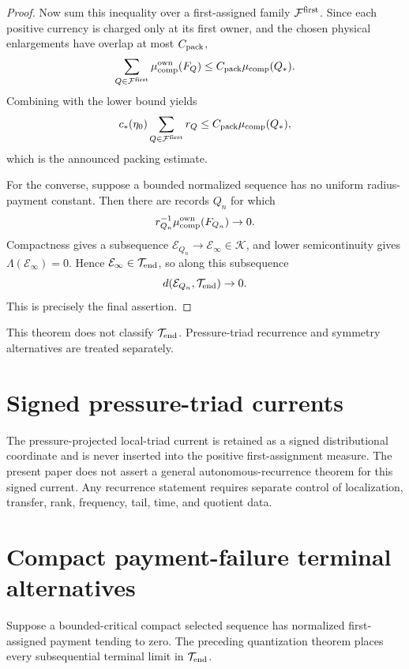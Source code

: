 \documentclass[11pt]{article}
\theoremstyle{definition}\newtheorem{problem}[theorem]{Problem}
\theoremstyle{definition}
\theoremstyle{remark}
\begin{document}
\begin{proof}
Now sum this inequality over a first-assigned family
\(\mathcal F^{\rm first}\).  Since each positive currency is charged only at
its first owner, and the chosen physical enlargements have overlap at most
\(C_{\rm pack}\),
\[
 \sum_{Q\in\mathcal F^{\rm first}}
 \mu_{\rm comp}^{\rm own}(F_Q)
 \le C_{\rm pack}\mu_{\rm comp}(Q_*).
\]
Combining with the lower bound yields
\[
 c_*(\eta_0)
 \sum_{Q\in\mathcal F^{\rm first}}r_Q
 \le C_{\rm pack}\mu_{\rm comp}(Q_*),
\]
which is the announced packing estimate.

For the converse, suppose a bounded normalized sequence has no uniform
radius-payment constant.  Then there are records \(Q_n\) for which
\[
 r_{Q_n}^{-1}\mu_{\rm comp}^{\rm own}(F_{Q_n})\to0.
\]
Compactness gives a subsequence
\(\mathcal E_{Q_n}\to\mathcal E_\infty\in\mathcal K\), and lower
semicontinuity gives \(\Lambda(\mathcal E_\infty)=0\).  Hence
\(\mathcal E_\infty\in\mathcal T_{\rm end}\), so along this subsequence
\[
 d(\mathcal E_{Q_n},\mathcal T_{\rm end})\to0.
\]
This is precisely the final assertion.
\end{proof}

This theorem does not classify $\mathcal T_{\rm end}$.  Pressure-triad recurrence and symmetry alternatives are treated separately.

\section{Signed pressure-triad currents}
The pressure-projected local-triad current is retained as a signed distributional
coordinate and is never inserted into the positive first-assignment measure.
The present paper does not assert a general autonomous-recurrence theorem for
this signed current.  Any recurrence statement requires separate control of
localization, transfer, rank, frequency, tail, time, and quotient data.

\section{Compact payment-failure terminal alternatives}
Suppose a bounded-critical compact selected sequence has normalized first-assigned payment tending to zero.  The preceding quantization theorem places every subsequential terminal limit in $\mathcal T_{\rm end}$.
\end{document}

